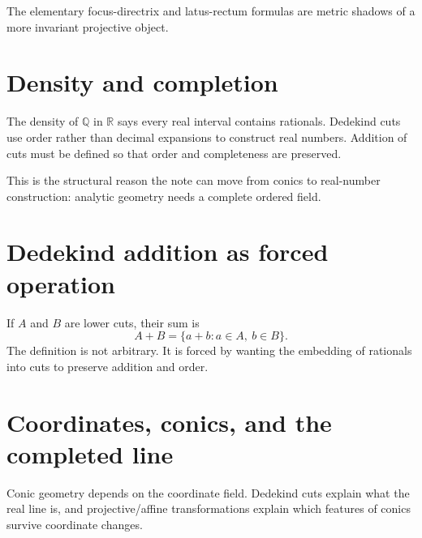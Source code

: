 The elementary focus-directrix and latus-rectum formulas are metric shadows of a more invariant projective object.

\section{Density and completion}

The density of \(\mathbb Q\) in \(\mathbb R\) says every real interval contains rationals.  Dedekind cuts use order rather than decimal expansions to construct real numbers.  Addition of cuts must be defined so that order and completeness are preserved.

This is the structural reason the note can move from conics to real-number construction: analytic geometry needs a complete ordered field.

\section{Dedekind addition as forced operation}

If \(A\) and \(B\) are lower cuts, their sum is
\[
  A+B=\{a+b:a\in A,\ b\in B\}.
\]
The definition is not arbitrary.  It is forced by wanting the embedding of rationals into cuts to preserve addition and order.

\section{Coordinates, conics, and the completed line}

Conic geometry depends on the coordinate field.  Dedekind cuts explain what the real line is, and projective/affine transformations explain which features of conics survive coordinate changes.

